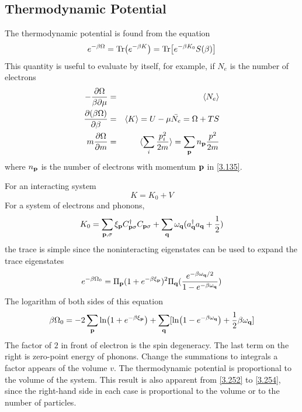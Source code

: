 \subsection{Thermodynamic Potential}
The thermodynamic potential is found from the equation
\begin{equation}
    e^{-\beta \Omega} = \Tr (e^{-\beta K} ) = \Tr[e^{-\beta K_0}S(\beta)]   \label{3.251}
\end{equation}
This quantity is useful to evaluate by itself, for example, if $N_e$ is the number of electrons
\begin{eqnarray}
    - \frac{\partial \Omega}{\beta \partial \mu} &=& \langle N_e \rangle  \label{3.252} \\
    \frac{\partial (\beta \Omega)}{\partial \beta} &=& \langle K \rangle = U - \mu \bar{N_e} = \Omega + TS \label{3.253} \\
    m \frac{\partial \Omega}{\partial m} &=& \langle \sum_i \frac{p_i^2}{2m} \rangle = \sum_{\mathbf{p}} n_{\mathbf{p}} \frac{p^2}{2m}     \label{3.254}
\end{eqnarray}
where $n_{\mathbf{p}}$ is the number of electrons with momentum $\mathbf{p}$ in \eqref{3.135}.

For an interacting system
\begin{equation}
    K = K_0 + V \label{3.256}
\end{equation}
For a system of electrons and phonons,
\begin{equation}
    K_0 = \sum_{\mathbf{p},\sigma} \xi_{\mathbf{p}} C^\dagger_{\mathbf{p}\sigma} C_{\mathbf{p}\sigma} + \sum_{\mathbf{q}} \omega_{\mathbf{q}} (a^\dagger_{\mathbf{q}} a_{\mathbf{q}} + \frac{1}{2} )  \label{3.258}
\end{equation}
the trace is simple since the noninteracting eigenstates can be used to expand the trace eigenstates
\begin{equation}
    e^{-\beta \Omega_0} = \Pi_{\mathbf{p}} (1 + e^{-\beta \xi_{\mathbf{p}}})^2 \Pi_{\mathbf{q}} ( \frac{e^{-\beta \omega_{\mathbf{q}}/2}}{1 - e^{-\beta \omega_{\mathbf{q}}}} )  \label{3.259}
\end{equation}
The logarithm of both sides of this equation
\begin{equation}
    \beta \Omega_0 = -2 \sum_{\mathbf{p}} \ln (1 + e^{-\beta \xi_{\mathbf{p}}}) + \sum_{\mathbf{q}} [ \ln(1- e^{-\beta \omega_{\mathbf{q}}}) + \frac{1}{2} \beta \omega_{\mathbf{q}}]
\end{equation}
The factor of $2$ in front of electron is the spin degeneracy.
The last term on the right is zero-point energy of phonons.
Change the summations to integrals a factor appears of the volume $v$.
The thermodynamic potential is proportional to the volume of the system.
This result is also apparent from \eqref{3.252} to \eqref{3.254}, since the right-hand side in each case is proportional to the volume or to the number of particles.

